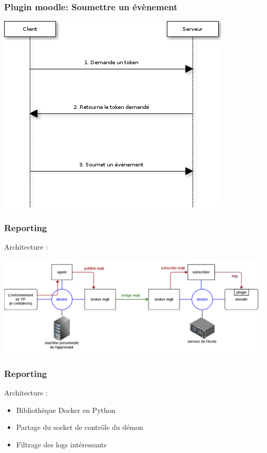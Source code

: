 \documentclass[10pt, compress]{beamer}
\begin{document}
\begin{frame}[fragile]
  \frametitle{Plugin moodle: Soumettre un évènement}
  \begin{center}
    \includegraphics[scale = 0.5]{../french/mem-seq-submit-event.png}
  \end{center}
\end{frame}

\begin{frame}[fragile]
  \frametitle{Reporting}
  Architecture :
   \begin{center}
  \includegraphics[scale = 0.25]{reporting.png}
   \end{center}
\end{frame}

\begin{frame}[fragile]
  \frametitle{Reporting}
  Architecture :
   \begin{itemize}[<+- | alert@+>]
      \item Bibliothèque Docker en Python
      \item Partage du socket de contrôle du démon
      \item Filtrage des logs intéressants
    \end{itemize}
\end{frame}
\end{document}
